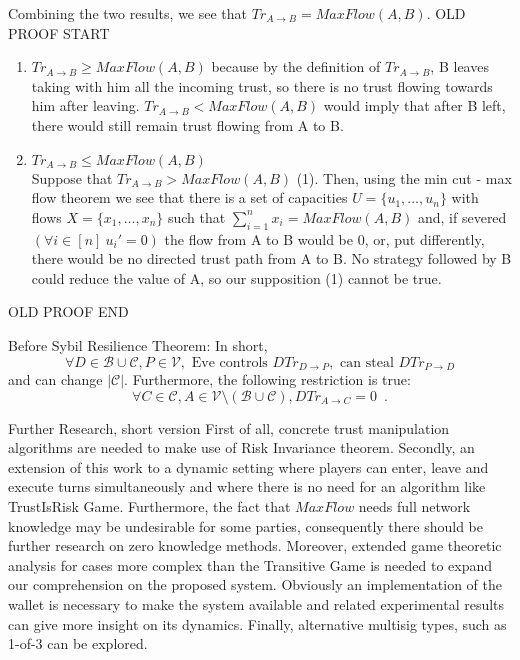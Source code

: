        Combining the two results, we see that $Tr_{A \rightarrow B} = MaxFlow(A, B)$.
        OLD PROOF START
        \begin{enumerate}
           \item $Tr_{A \rightarrow B} \geq MaxFlow(A, B)$ because by the definition of $Tr_{A \rightarrow B}$,
           B leaves taking with him all the incoming trust, so there is no trust flowing towards him after leaving.
           $Tr_{A \rightarrow B} < MaxFlow(A, B)$ would imply that after B left, there would still remain trust
           flowing from A to B.
           \item $Tr_{A \rightarrow B} \leq MaxFlow(A, B)$ \\
           Suppose that $Tr_{A \rightarrow B} > MaxFlow(A, B)$ (1). Then, using the min cut - max flow theorem we
           see that there is a set of capacities $U= \{u_1,\dots,u_n\}$ with flows $X = \{x_1,\dots,x_n\}$ such that
           $\sum\limits_{i=1}^{n}{x_i} = MaxFlow(A, B)$ and, if severed $(\forall i \in [n] \: u_i' = 0)$
           the flow from A to B would be $0$, or, put differently, there would be no directed trust path from A to B. No
           strategy followed by B could reduce the value of A, so our supposition (1) cannot be true.
        \end{enumerate}
        OLD PROOF END

Before Sybil Resilience Theorem:
    In short,
    \begin{equation}
      \forall D \in \mathcal{B} \cup \mathcal{C}, P \in \mathcal{V}, \mbox{ Eve controls } DTr_{D \rightarrow P}, \mbox{ can
      steal } DTr_{P \rightarrow D}
    \end{equation}
    and can change $|\mathcal{C}|$.
    Furthermore, the following restriction is true:
    \begin{equation}
       \forall C \in \mathcal{C}, A \in \mathcal{V} \setminus \left(\mathcal{B} \cup \mathcal{C}\right), DTr_{A \rightarrow
       C} = 0 \enspace.
    \end{equation}

     Further Research, short version
     First of all, concrete trust manipulation algorithms are needed to make use of Risk Invariance theorem. Secondly, an
     extension of this work to a dynamic setting where players can enter, leave and execute turns simultaneously and where
     there is no need for an algorithm like TrustIsRisk Game. Furthermore, the fact that $MaxFlow$ needs full network
     knowledge may be undesirable for some parties, consequently there should be further research on zero knowledge methods.
     Moreover, extended game theoretic analysis for cases more complex than the Transitive Game is needed to expand our
     comprehension on the proposed system. Obviously an implementation of the wallet is necessary to make the system
     available and related experimental results can give more insight on its dynamics. Finally, alternative multisig types,
     such as 1-of-3 can be explored.

